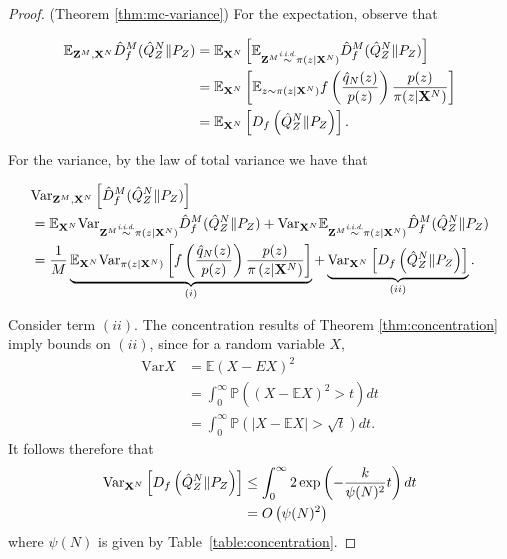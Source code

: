 \begin{proof}(Theorem \ref{thm:mc-variance})
For the expectation, observe that

\begin{align*}
    \mathbb{E}_{\mathbf{Z}^M, \mathbf{X}^N} \hat{D}^M_f( \hat{Q}_Z^N \| P_Z)
    &=\mathbb{E}_{\mathbf{X}^N} \left[ \mathbb{E}_{\mathbf{Z}^M \overset{\text{\emph{i.i.d.}}}{\sim} \pi(z | \mathbf{X}^N)} \hat{D}^M_f( \hat{Q}_Z^N \| P_Z)\right] \\
    &= \mathbb{E}_{\mathbf{X}^N} \left[ \mathbb{E}_{z \sim \pi(z | \mathbf{X}^N)} f\left(\frac{\hat{q}_N(z)}{p(z)} \right) \frac{p(z)}{\pi(z|\mathbf{X}^N)} \right] \\
    &=\mathbb{E}_{\mathbf{X}^N} \left[ D_f\left( \hat{Q}^N_Z \| P_Z \right)\right].
\end{align*}

For the variance, by the law of total variance we have that

\begin{align*}
    &\text{Var}_{\mathbf{Z}^M, \mathbf{X}^N} \left[\hat{D}^M_f( \hat{Q}_Z^N \| P_Z)  \right]  \\
    &= \mathbb{E}_{\mathbf{X}^N} \text{Var}_{\mathbf{Z}^M \overset{\text{\emph{i.i.d.}}}{\sim} \pi(z|\mathbf{X}^N)} \hat{D}^M_f( \hat{Q}_Z^N \| P_Z) + \text{Var}_{\mathbf{X}^N} \mathbb{E}_{\mathbf{Z}^M \overset{\text{\emph{i.i.d.}}}{\sim} \pi(z|\mathbf{X}^N)} \hat{D}^M_f( \hat{Q}_Z^N \| P_Z)
    \\
    &=\frac{1}{M} \underbrace{\mathbb{E}_{\mathbf{X}^N} \text{Var}_{\pi(z|\mathbf{X}^N)} \left[ f\left( \frac{\hat{q}_N(z)}{p(z)} \right) \frac{p(z)}{\pi\left(z|\mathbf{X}^N\right)} \right]}_{(i)}  + \underbrace{\text{Var}_{\mathbf{X}^N} \left[D_f\left( \hat{Q}^N_Z \| P_Z \right)\right]}_{(ii)}.
\end{align*}

Consider term $(ii)$.
The concentration results of Theorem \ref{thm:concentration} imply bounds on $(ii)$, since for a random variable $X$,
\begin{align*}
    \text{Var}X &= \mathbb{E} (X - EX)^2 \\
    &= \int_0^\infty \mathbb{P}\left( (X - \mathbb{E} X)^2 > t \right) dt \\
    &= \int_0^\infty \mathbb{P} \left( \left| X - \mathbb{E} X \right| > \sqrt{t} \right) dt.
\end{align*}
It follows therefore that
\begin{align*}
    \text{Var}_{\mathbf{X}^N} \left[D_f\left( \hat{Q}^N_Z \| P_Z \right)\right] 
    &\leq \int_0^\infty 2 \exp\left( -\frac{k}{\psi(N)^2}t \right) dt\\
    &= O\left(\psi(N)^2 \right)
\end{align*}
where $\psi(N)$ is given by Table~\ref{table:concentration}.


\end{proof}
